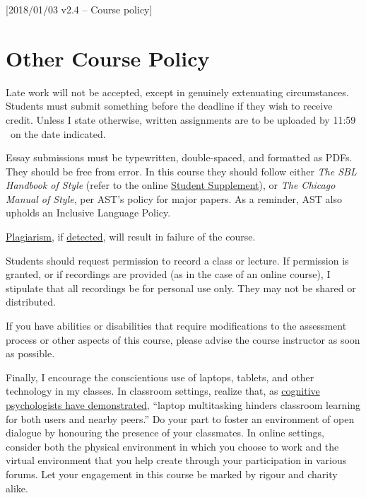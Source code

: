 [2018/01/03 v2.4 -- Course policy]

\section{Other Course Policy}
\label{policy}

Late work will not be accepted, except in genuinely extenuating
circumstances. Students must submit something before the deadline if
they wish to receive credit. Unless I state otherwise, written
assignments are to be uploaded by 11:59 \PM\ on the date indicated.

Essay submissions must be typewritten, double-spaced, and formatted as
PDFs. They should be free from error. In this course they should follow
either \emph{The SBL Handbook of Style} (refer to the online
\href{https://www.sbl-site.org/assets/pdfs/pubs/SBLHSsupp2015-02.pdf}{
Student Supplement}), or \emph{The Chicago Manual of Style}, per AST's
policy for major papers. As a reminder, AST also upholds an Inclusive
Language Policy.

\href{http://www.eerdmans.com/Pages/Item/59043/Commentary-Statement.aspx}{Plagiarism},
if \href{https://www.theguardian.com/world/2013/feb/09/german-education-minister-quits-phd-plagiarism}{detected},
will result in failure of the course.

Students should request permission to record a class or lecture. If
permission is granted, or if recordings are provided (as in the case of
an online course), I stipulate that all recordings be for personal use
only. They may not be shared or distributed.

If you have abilities or disabilities that require modifications to the
assessment process or other aspects of this course, please advise the
course instructor as soon as possible.

Finally, I encourage the conscientious use of laptops, tablets, and
other technology in my classes. In classroom settings, realize that, as
\href{http://dx.doi.org/10.1016/j.compedu.2012.10.003}{cognitive
psychologists have demonstrated}, ``laptop multitasking hinders
classroom learning for both users and nearby peers.'' Do your part to
foster an environment of open dialogue by honouring the presence of your
classmates. In online settings, consider both the physical environment
in which you choose to work and the virtual environment that you help
create through your participation in various forums. Let your engagement
in this course be marked by rigour and charity alike.